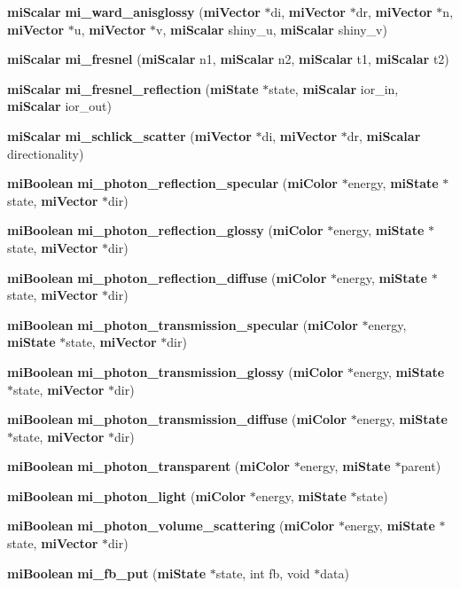 \begin{CompactItemize}
\item 
{\bf mi\-Scalar} {\bf mi\_\-ward\_\-anisglossy} ({\bf mi\-Vector} $\ast$di, {\bf mi\-Vector} $\ast$dr, {\bf mi\-Vector} $\ast$n, {\bf mi\-Vector} $\ast$u, {\bf mi\-Vector} $\ast$v, {\bf mi\-Scalar} shiny\_\-u, {\bf mi\-Scalar} shiny\_\-v)
\item 
{\bf mi\-Scalar} {\bf mi\_\-fresnel} ({\bf mi\-Scalar} n1, {\bf mi\-Scalar} n2, {\bf mi\-Scalar} t1, {\bf mi\-Scalar} t2)
\item 
{\bf mi\-Scalar} {\bf mi\_\-fresnel\_\-reflection} ({\bf mi\-State} $\ast$state, {\bf mi\-Scalar} ior\_\-in, {\bf mi\-Scalar} ior\_\-out)
\item 
{\bf mi\-Scalar} {\bf mi\_\-schlick\_\-scatter} ({\bf mi\-Vector} $\ast$di, {\bf mi\-Vector} $\ast$dr, {\bf mi\-Scalar} directionality)
\item 
{\bf mi\-Boolean} {\bf mi\_\-photon\_\-reflection\_\-specular} ({\bf mi\-Color} $\ast$energy, {\bf mi\-State} $\ast$state, {\bf mi\-Vector} $\ast$dir)
\item 
{\bf mi\-Boolean} {\bf mi\_\-photon\_\-reflection\_\-glossy} ({\bf mi\-Color} $\ast$energy, {\bf mi\-State} $\ast$state, {\bf mi\-Vector} $\ast$dir)
\item 
{\bf mi\-Boolean} {\bf mi\_\-photon\_\-reflection\_\-diffuse} ({\bf mi\-Color} $\ast$energy, {\bf mi\-State} $\ast$state, {\bf mi\-Vector} $\ast$dir)
\item 
{\bf mi\-Boolean} {\bf mi\_\-photon\_\-transmission\_\-specular} ({\bf mi\-Color} $\ast$energy, {\bf mi\-State} $\ast$state, {\bf mi\-Vector} $\ast$dir)
\item 
{\bf mi\-Boolean} {\bf mi\_\-photon\_\-transmission\_\-glossy} ({\bf mi\-Color} $\ast$energy, {\bf mi\-State} $\ast$state, {\bf mi\-Vector} $\ast$dir)
\item 
{\bf mi\-Boolean} {\bf mi\_\-photon\_\-transmission\_\-diffuse} ({\bf mi\-Color} $\ast$energy, {\bf mi\-State} $\ast$state, {\bf mi\-Vector} $\ast$dir)
\item 
{\bf mi\-Boolean} {\bf mi\_\-photon\_\-transparent} ({\bf mi\-Color} $\ast$energy, {\bf mi\-State} $\ast$parent)
\item 
{\bf mi\-Boolean} {\bf mi\_\-photon\_\-light} ({\bf mi\-Color} $\ast$energy, {\bf mi\-State} $\ast$state)
\item 
{\bf mi\-Boolean} {\bf mi\_\-photon\_\-volume\_\-scattering} ({\bf mi\-Color} $\ast$energy, {\bf mi\-State} $\ast$state, {\bf mi\-Vector} $\ast$dir)
\item 
{\bf mi\-Boolean} {\bf mi\_\-fb\_\-put} ({\bf mi\-State} $\ast$state, int fb, void $\ast$data)

\end{CompactItemize}
